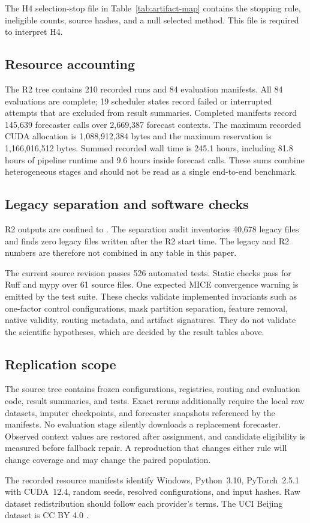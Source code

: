 The H4 selection-stop file in Table~\ref{tab:artifact-map} contains the stopping rule, ineligible counts, source hashes, and a null selected method. This file is required to interpret H4.

\subsection{Resource accounting}

The R2 tree contains 210 recorded runs and 84 evaluation manifests. All 84 evaluations are complete; 19 scheduler states record failed or interrupted attempts that are excluded from result summaries. Completed manifests record 145,639 forecaster calls over 2,669,387 forecast contexts. The maximum recorded CUDA allocation is 1,088,912,384 bytes and the maximum reservation is 1,166,016,512 bytes. Summed recorded wall time is 245.1 hours, including 81.8 hours of pipeline runtime and 9.6 hours inside forecast calls. These sums combine heterogeneous stages and should not be read as a single end-to-end benchmark.

\subsection{Legacy separation and software checks}

R2 outputs are confined to . The separation audit inventories 40,678 legacy files and finds zero legacy files written after the R2 start time. The legacy and R2 numbers are therefore not combined in any table in this paper.

The current source revision passes 526 automated tests. Static checks pass for Ruff and mypy over 61 source files. One expected MICE convergence warning is emitted by the test suite. These checks validate implemented invariants such as one-factor control configurations, mask partition separation, feature removal, native validity, routing metadata, and artifact signatures. They do not validate the scientific hypotheses, which are decided by the result tables above.

\subsection{Replication scope}

The source tree contains frozen configurations, registries, routing and evaluation code, result summaries, and tests. Exact reruns additionally require the local raw datasets, imputer checkpoints, and forecaster snapshots referenced by the manifests. No evaluation stage silently downloads a replacement forecaster. Observed context values are restored after assignment, and candidate eligibility is measured before fallback repair. A reproduction that changes either rule will change coverage and may change the paired population.

The recorded resource manifests identify Windows, Python~3.10, PyTorch~2.5.1 with CUDA~12.4, random seeds, resolved configurations, and input hashes. Raw dataset redistribution should follow each provider's terms. The UCI Beijing dataset is CC BY 4.0 \citep{chen2017beijing}.

